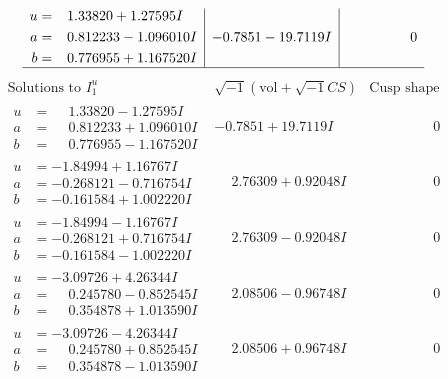 \documentclass[1p]{elsarticle_modified}
\theoremstyle{definition}
\newcommand{\I}{\sqrt{-1}}
\begin{document}
$$\begin{array}{c|c|c}
\begin{aligned}
u &= \phantom{-}1.33820 + 1.27595 I \\
a &= \phantom{-}0.812233 - 1.096010 I \\
b &= \phantom{-}0.776955 + 1.167520 I\end{aligned}
 & -0.7851 - 19.7119 I & \phantom{-0.000000 } 0\\
 \hline 
 \end{array}$$\newpage$$\begin{array}{c|c|c}  
\text{Solutions to }I^u_{1}& \I (\text{vol} + \sqrt{-1}CS) & \text{Cusp shape}\\
 \hline 
\begin{aligned}
u &= \phantom{-}1.33820 - 1.27595 I \\
a &= \phantom{-}0.812233 + 1.096010 I \\
b &= \phantom{-}0.776955 - 1.167520 I\end{aligned}
 & -0.7851 + 19.7119 I & \phantom{-0.000000 } 0 \\ \hline\begin{aligned}
u &= -1.84994 + 1.16767 I \\
a &= -0.268121 - 0.716754 I \\
b &= -0.161584 + 1.002220 I\end{aligned}
 & \phantom{-}2.76309 + 0.92048 I & \phantom{-0.000000 } 0 \\ \hline\begin{aligned}
u &= -1.84994 - 1.16767 I \\
a &= -0.268121 + 0.716754 I \\
b &= -0.161584 - 1.002220 I\end{aligned}
 & \phantom{-}2.76309 - 0.92048 I & \phantom{-0.000000 } 0 \\ \hline\begin{aligned}
u &= -3.09726 + 4.26344 I \\
a &= \phantom{-}0.245780 - 0.852545 I \\
b &= \phantom{-}0.354878 + 1.013590 I\end{aligned}
 & \phantom{-}2.08506 - 0.96748 I & \phantom{-0.000000 } 0 \\ \hline\begin{aligned}
u &= -3.09726 - 4.26344 I \\
a &= \phantom{-}0.245780 + 0.852545 I \\
b &= \phantom{-}0.354878 - 1.013590 I\end{aligned}
 & \phantom{-}2.08506 + 0.96748 I & \phantom{-0.000000 } 0 \\ \hline\begin{aligned}

\end{aligned}
\end{array}$$
\end{document}
